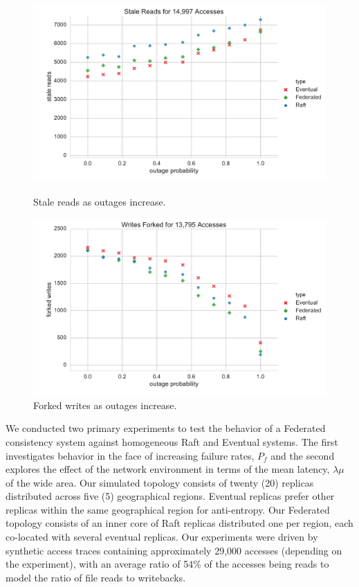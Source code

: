 \documentclass[10pt,conference,letterpaper]{IEEEtran}
\begin{document}
\begin{figure}[t]
    \centering
      \includegraphics[width=\linewidth]{figures/outages/stale_reads}
      \caption{Stale reads as outages increase.}\label{fig:outages_stale_reads}
    \endminipage
      \includegraphics[width=\linewidth]{figures/outages/forked_writes}
      \caption{Forked writes as outages increase.}\label{fig:outages_forked_writes}
    \endminipage\hfill
\end{figure}

We conducted two primary experiments to test the behavior of a Federated consistency
system against homogeneous Raft and Eventual systems.
The first investigates behavior in the face of increasing failure rates, $P_f$ and the
second explores the effect of the network environment in terms of the mean latency,
$\lambda{\mu}$ of the wide area.
Our simulated topology consists of twenty (20) replicas distributed across five (5)
geographical regions.
Eventual replicas prefer other replicas within the same geographical region for
anti-entropy.
Our Federated topology consists of an inner core of Raft replicas distributed one per region,
each co-located with several eventual replicas.
Our experiments were driven by synthetic access traces containing approximately 29,000
accesses (depending on the experiment), with an average ratio of 54\% of the accesses
being reads to model the ratio of file reads to writebacks.
\end{document}
